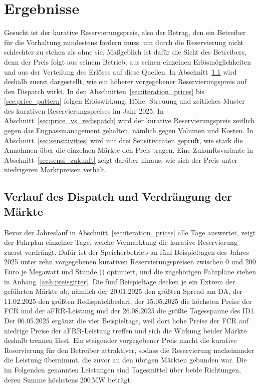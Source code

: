 \chapter{Ergebnisse}
\label{ch:results}

Gesucht ist der kurative Reservierungspreis, also der Betrag, den ein Betreiber für die Vorhaltung mindestens fordern muss, um durch die Reservierung nicht schlechter zu stehen als ohne sie.
Maßgeblich ist dafür die Sicht des Betreibers, denn der Preis folgt aus seinem Betrieb, aus seinen einzelnen Erlösmöglichkeiten und aus der Verteilung des Erlöses auf diese Quellen.
In Abschnitt~\ref{sec:dispatch_displacement} wird deshalb zuerst dargestellt, wie ein höherer vorgegebener Reservierungspreis auf den Dispatch wirkt.
In den Abschnitten~\ref{sec:iteration_prices} bis \ref{sec:price_pattern} folgen Erlöswirkung, Höhe, Streuung und zeitliches Muster des kurativen Reservierungspreises im Jahr 2025.
In Abschnitt~\ref{sec:price_vs_redispatch} wird der kurative Reservierungspreis zeitlich gegen das Engpassmanagement gehalten, nämlich gegen Volumen und Kosten.
In Abschnitt~\ref{sec:sensitivities} wird mit drei Sensitivitäten geprüft, wie stark die Annahmen über die einzelnen Märkte den Preis tragen.
Eine Zukunftsvariante in Abschnitt~\ref{sec:sensi_zukunft} zeigt darüber hinaus, wie sich der Preis unter niedrigeren Marktpreisen verhält.

\section{Verlauf des Dispatch und Verdrängung der Märkte}
\label{sec:dispatch_displacement}

Bevor der Jahreslauf in Abschnitt~\ref{sec:iteration_prices} alle Tage auswertet, zeigt der Fahrplan einzelner Tage, welche Vermarktung die kurative Reservierung zuerst verdrängt.
Dafür ist der Speicherbetrieb an fünf Beispieltagen des Jahres 2025 unter zehn vorgegebenen kurativen Reservierungspreisen zwischen 0 und 200 Euro je Megawatt und Stunde (\EurMWh{}) optimiert, und die zugehörigen Fahrpläne stehen in Anhang~\ref{anh:preisgitter}.
Die fünf Beispieltage decken je ein Extrem der geführten Märkte ab, nämlich der 20.01.2025 den größten Spread am \ac{DA}, der 11.02.2025 den größten Redispatchbedarf, der 15.05.2025 die höchsten Preise der \ac{FCR} und der \ac{aFRR}-Leistung und der 26.08.2025 die größte Tagesspanne des \ac{ID1}.
Der 06.05.2025 ergänzt die vier Beispieltage, weil dort hohe Preise der \ac{FCR} auf niedrige Preise der \ac{aFRR}-Leistung treffen und sich die Wirkung beider Märkte deshalb trennen lässt.
Ein steigender vorgegebener Preis macht die kurative Reservierung für den Betreiber attraktiver, sodass die Reservierung nacheinander die Leistung übernimmt, die zuvor an den übrigen Märkten gebunden war.
Die im Folgenden genannten Leistungen sind Tagesmittel über beide Richtungen, deren Summe höchstens 200\,\si{MW} beträgt.

